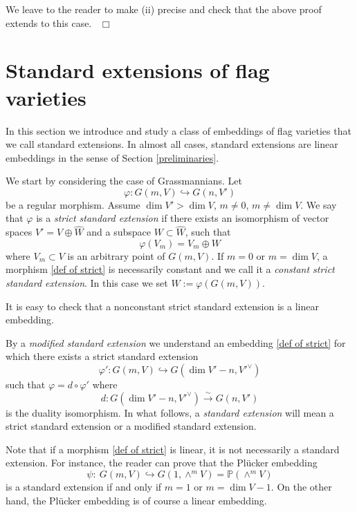 \documentclass[12pt]{amsart}
\renewcommand{\phi}{\varphi}
\theoremstyle{definition}
\begin{document}
We leave to the reader to make (ii) precise and check that the 
above proof extends to this case.  ~\hfill$\Box$



\vspace{1cm}
\section{Standard extensions of flag varieties}
\label{linear embed}
\vspace{5mm}

In this section we introduce and study a class of 
embeddings of flag varieties that we call standard 
extensions. In almost all cases, standard extensions are 
linear embeddings in the sense of Section \ref{preliminaries}.

We start by considering the case of Grassmannians. Let
\begin{equation}\label{def of strict}
\varphi: G(m,V) \hookrightarrow G(n,V')
\end{equation}
be a regular morphism. Assume $\dim V'>\dim V$, $m\ne0$, $m\ne
\dim V$. We say that $\varphi$ is a \textit{strict standard 
extension} if there exists an isomorphism of vector spaces 
$V'=V\oplus\widehat{W}$ and a subspace $W\subset\widehat{W}$, 
such that 
\begin{equation*}\label{def of strict2}
\varphi(V_m)=V_m\oplus W
\end{equation*} 
where $V_m\subset V$ is an arbitrary point of $G(m,V)$. If 
$m=0$ or $m=\dim V$, a morphism \eqref{def of strict} is
necessarily constant and we call it a \textit{constant strict 
standard extension}. In this case we set $W:=\phi(G(m,V))$.


It is easy to check that a nonconstant strict standard  
extension is a linear embedding. 

By a \textit{modified standard extension} we understand an 
embedding \eqref{def of strict} for which there exists a 
strict standard extension
$$
\varphi':G(m,V)\hookrightarrow G(\dim V'-n,V'^{\vee})
$$
such that $\varphi=d\circ\varphi'$ where
$$
d:G(\dim V'-n,V'^{\vee})\xrightarrow{\sim}G(n,V')
$$
is the duality isomorphism. In what follows, a \textit{standard
extension} will mean a strict standard extension or a modified
standard extension.    

Note that if a morphism \eqref{def of strict} is linear, it is
not necessarily a standard extension. For instance, the reader 
can prove that the Pl\"ucker embedding 
$$
\psi:\ G(m,V)\hookrightarrow G(1,\wedge^mV)=\mathbb{P}
(\wedge^m V)
$$
is a standard extension if and only if $m=1$ or $m=\dim V-1$.
On the other hand, the Pl\"ucker embedding is of course a 
linear embedding.
\end{document}

